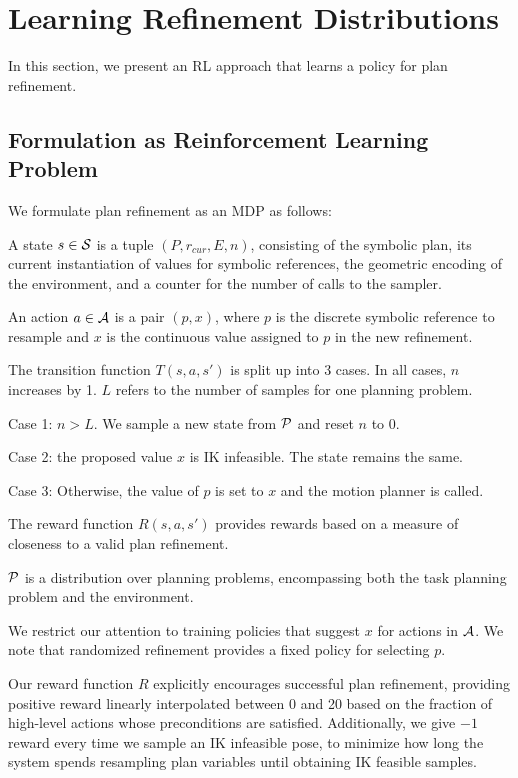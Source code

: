 \section{Learning Refinement Distributions}
In this section, we present an RL approach that learns a policy for plan refinement.

\subsection{Formulation as Reinforcement Learning Problem}
We formulate plan refinement as an MDP as follows:
\begin{tightlist}
\item A state $s \in \mathcal{S}$ is a tuple $(P, r_{cur}, E, n)$, consisting of the
symbolic plan, its current instantiation of values for symbolic references,
the geometric encoding of the environment, and a counter for
the number of calls to the sampler.
\item An action $a \in \mathcal{A}$ is a pair $(p, x)$, where $p$ is the discrete symbolic
reference to resample and $x$ is the continuous value assigned to $p$ in the new refinement.
\item The transition function $T(s, a, s')$ is split up into 3 cases. In all cases, $n$ increases by 1. $L$ refers to
the number of samples for one planning problem.
  \begin{tightlist}
  \item Case 1: $n > L$. We sample a new state from $\mathcal{P}$ and reset $n$ to 0.
  \item Case 2: the proposed value $x$ is IK infeasible. The state remains the same.
  \item Case 3: Otherwise, the value of $p$ is set to $x$ and the motion planner is called.
  \end{tightlist}
\item The reward function $R(s, a, s')$ provides rewards based on a measure of closeness to a valid plan refinement.
\item $\mathcal{P}$ is a distribution over planning problems, encompassing both the task planning problem
and the environment.
\end{tightlist}

We restrict our attention to training policies that suggest $x$ for actions in $\mathcal{A}$.
We note that randomized refinement provides a fixed policy for selecting $p$.

Our reward function $R$ explicitly encourages successful plan refinement, providing positive reward linearly
interpolated between 0 and 20 based on the fraction of high-level actions whose preconditions are
satisfied. Additionally, we give $-1$ reward every time we sample an IK infeasible pose,
to minimize how long the system spends resampling plan variables until obtaining IK feasible samples.

